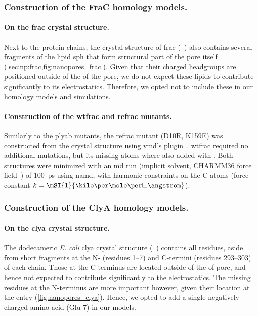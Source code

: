 \subsubsection{Construction of the FraC homology models.}
%

\paragraph{On the \gls{frac} crystal structure.}
%
Next to the protein chains, the crystal structure of \gls{frac} (~\cite{Tanaka-2015}) also
contains several fragments of the lipid \gls{sph} that form structural part of the pore itself
(\cref{sec:np:frac,fig:nanopores_frac}). Given that their charged headgroups are positioned outside of the
\lumen{} of the pore, we do not expect these lipids to contribute significantly to its electrostatics.
Therefore, we opted not to include these in our homology models and simulations.

\paragraph{Construction of the \gls{wtfrac} and \gls{refrac} mutants.}
%
Similarly to the \gls{plyab} mutants, the \gls{refrac} mutant (D10R, K159E) was constructed from the crystal
structure using \gls{vmd}'s  plugin~\cite{Humphrey-1996}. \Gls{wtfrac} required no additional
mutations, but its missing atoms where also added with . Both structures were minimized with an
\gls{md} run (implicit solvent, CHARMM36 force field~\cite{Best-2012}) of \SI{100}{\ps} using \gls{namd}, with
harmonic constraints on the C\ta{} atoms (force constant $k=\mSI{1}{\kilo\cal\per\mole\per\square\angstrom}$).


\subsubsection{Construction of the ClyA homology models.}
%

\paragraph{On the \gls{clya} crystal structure.}
%
The dodecameric \textit{E. coli} \gls{clya} crystal structure (~\cite{Mueller-2009}) contains all
residues, aside from short fragments at the N- (residues \numrange{1}{7}) and C-termini (residues
\numrange{293}{303}) of each chain. Those at the C-terminus are located outside of the \lumen{} of pore, and
hence not expected to contribute significantly to the electrostatics. The missing residues at the N-terminus
are more important however, given their location at the \transi{} entry (\cref{fig:nanopores_clya}). Hence, we
opted to add a single negatively charged amino acid (Glu 7) in our models.

